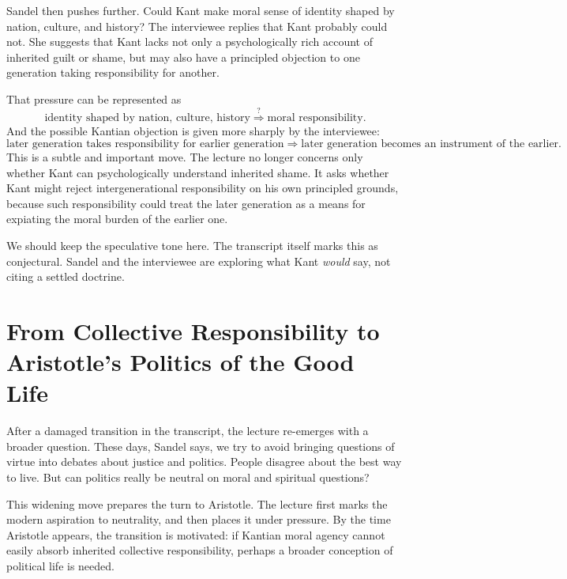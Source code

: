 Sandel then pushes further. Could Kant make moral sense of identity shaped by nation, culture, and history? The interviewee replies that Kant probably could not. She suggests that Kant lacks not only a psychologically rich account of inherited guilt or shame, but may also have a principled objection to one generation taking responsibility for another.

That pressure can be represented as
\begin{equation}
\text{identity shaped by nation, culture, history}
\stackrel{?}{\Longrightarrow}
\text{moral responsibility}.
\end{equation}
And the possible Kantian objection is given more sharply by the interviewee:
\begin{equation}
\text{later generation takes responsibility for earlier generation}
\Longrightarrow
\text{later generation becomes an instrument of the earlier}.
\end{equation}
This is a subtle and important move. The lecture no longer concerns only whether Kant can psychologically understand inherited shame. It asks whether Kant might reject intergenerational responsibility on his own principled grounds, because such responsibility could treat the later generation as a means for expiating the moral burden of the earlier one.

We should keep the speculative tone here. The transcript itself marks this as conjectural. Sandel and the interviewee are exploring what Kant \emph{would} say, not citing a settled doctrine.

\section{From Collective Responsibility to Aristotle's Politics of the Good Life}

After a damaged transition in the transcript, the lecture re-emerges with a broader question. These days, Sandel says, we try to avoid bringing questions of virtue into debates about justice and politics. People disagree about the best way to live. But can politics really be neutral on moral and spiritual questions?

This widening move prepares the turn to Aristotle. The lecture first marks the modern aspiration to neutrality, and then places it under pressure. By the time Aristotle appears, the transition is motivated: if Kantian moral agency cannot easily absorb inherited collective responsibility, perhaps a broader conception of political life is needed.

